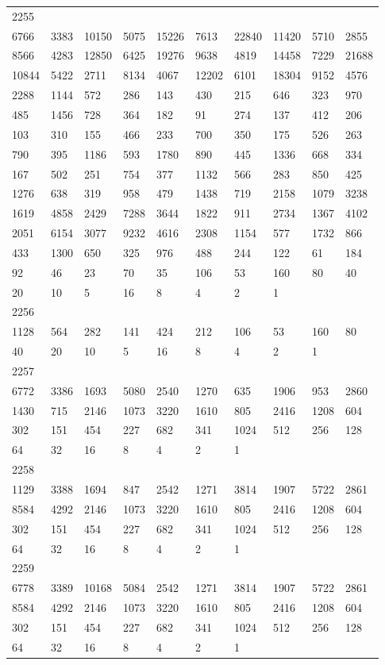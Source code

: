 \begin{longtable}{*{10}{l}}
2255&&&&&&&&&\\
6766& 3383& 10150& 5075& 15226& 7613& 22840& 11420& 5710& 2855\\
8566& 4283& 12850& 6425& 19276& 9638& 4819& 14458& 7229& 21688\\
10844& 5422& 2711& 8134& 4067& 12202& 6101& 18304& 9152& 4576\\
2288& 1144& 572& 286& 143& 430& 215& 646& 323& 970\\
485& 1456& 728& 364& 182& 91& 274& 137& 412& 206\\
103& 310& 155& 466& 233& 700& 350& 175& 526& 263\\
790& 395& 1186& 593& 1780& 890& 445& 1336& 668& 334\\
167& 502& 251& 754& 377& 1132& 566& 283& 850& 425\\
1276& 638& 319& 958& 479& 1438& 719& 2158& 1079& 3238\\
1619& 4858& 2429& 7288& 3644& 1822& 911& 2734& 1367& 4102\\
2051& 6154& 3077& 9232& 4616& 2308& 1154& 577& 1732& 866\\
433& 1300& 650& 325& 976& 488& 244& 122& 61& 184\\
92& 46& 23& 70& 35& 106& 53& 160& 80& 40\\
20& 10& 5& 16& 8& 4& 2& 1& \\

2256&&&&&&&&&\\
1128& 564& 282& 141& 424& 212& 106& 53& 160& 80\\
40& 20& 10& 5& 16& 8& 4& 2& 1& \\

2257&&&&&&&&&\\
6772& 3386& 1693& 5080& 2540& 1270& 635& 1906& 953& 2860\\
1430& 715& 2146& 1073& 3220& 1610& 805& 2416& 1208& 604\\
302& 151& 454& 227& 682& 341& 1024& 512& 256& 128\\
64& 32& 16& 8& 4& 2& 1& \\

2258&&&&&&&&&\\
1129& 3388& 1694& 847& 2542& 1271& 3814& 1907& 5722& 2861\\
8584& 4292& 2146& 1073& 3220& 1610& 805& 2416& 1208& 604\\
302& 151& 454& 227& 682& 341& 1024& 512& 256& 128\\
64& 32& 16& 8& 4& 2& 1& \\

2259&&&&&&&&&\\
6778& 3389& 10168& 5084& 2542& 1271& 3814& 1907& 5722& 2861\\
8584& 4292& 2146& 1073& 3220& 1610& 805& 2416& 1208& 604\\
302& 151& 454& 227& 682& 341& 1024& 512& 256& 128\\
64& 32& 16& 8& 4& 2& 1& \\


\end{longtable}
